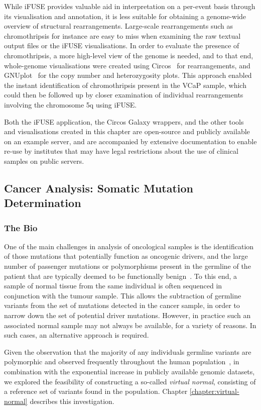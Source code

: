 While iFUSE provides valuable aid in interpretation on a per-event basis through its visualisation and annotation, it is less suitable for obtaining a genome-wide overview of structural rearrangements. Large-scale rearrangements such as chromothripsis for instance are easy to miss when examining the raw textual output files or the iFUSE visualisations. In order to evaluate the presence of chromothripsis, a more high-level view of the genome is needed, and to that end, whole-genome visualisations were created using Circos~\cite{circos} for rearrangements, and GNUplot~\cite{url-gnuplot} for the copy number and heterozygosity plots. This approach enabled the instant identification of chromothripsis present in the VCaP sample, which could then be followed up by closer examination of individual rearrangements involving the chromosome 5q using iFUSE.

Both the iFUSE application, the Circos Galaxy wrappers, and the other tools and visualisations created in this chapter are open-source and publicly available on an example server, and are accompanied by extensive documentation to enable re-use by institutes that may have legal restrictions about the use of clinical samples on public servers.

\subsection{Cancer Analysis: Somatic Mutation Determination}
\subsubsection{The Bio}
One of the main challenges in analysis of oncological samples is the identification of those mutations that potentially function as oncogenic drivers, and the large number of passenger mutations or polymorphisms present in the germline of the patient that are typically deemed to be functionally benign~\cite{lawrence2013mutational}. To this end, a sample of normal tissue from the same individual is often sequenced in conjunction with the tumour sample. This allows the subtraction of germline variants from the set of mutations detected in the cancer sample, in order to narrow down the set of potential driver mutations. However, in practice such an associated normal sample may not always be available, for a variety of reasons. In such cases, an alternative approach is required.

Given the observation that the majority of any individuals germline variants are polymorphic and observed frequently throughout the human population~\cite{10002010map,10002012integrated}, in combination with the exponential increase in publicly available genomic datasets, we explored the feasibility of constructing a so-called \emph{virtual normal}, consisting of a reference set of variants found in the population. Chapter \ref{chapter:virtual-normal} describes this investigation.

